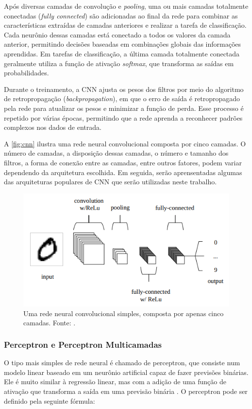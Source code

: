 Após diversas camadas de convolução e \textit{pooling}, uma ou mais camadas totalmente conectadas (\textit{fully connected}) são adicionadas ao final da rede para combinar as características extraídas de camadas anteriores e realizar a tarefa de classificação. Cada neurônio dessas camadas está conectado a todos os valores da camada anterior, permitindo decisões baseadas em combinações globais das informações aprendidas. Em tarefas de classificação, a última camada totalmente conectada geralmente utiliza a função de ativação \textit{softmax}, que transforma as saídas em probabilidades.

Durante o treinamento, a CNN ajusta os pesos dos filtros por meio do algoritmo de retropropagação (\textit{backpropagation}), em que o erro de saída é retropropagado pela rede para atualizar os pesos e minimizar a função de perda. Esse processo é repetido por várias épocas, permitindo que a rede aprenda a reconhecer padrões complexos nos dados de entrada.

A \autoref{fig:cnn} ilustra uma rede neural convolucional composta por cinco camadas. O número de camadas, a disposição dessas camadas, o número e tamanho dos filtros, a forma de conexão entre as camadas, entre outros fatores, podem variar dependendo da arquitetura escolhida. Em seguida, serão aprensentadas algumas das arquiteturas populares de CNN que serão utilizadas neste trabalho.

\begin{figure}
    \centering
    \includegraphics[width=0.5\linewidth]{figs/convolution-neural-network.png}
    \caption{Uma rede neural convolucional simples, composta por apenas cinco camadas. Fonte: \cite{Saxena2022}.}
    \label{fig:cnn}
\end{figure}

\subsubsection{Perceptron e Perceptron Multicamadas}


O tipo mais simples de rede neural é chamado de perceptron, que consiste num modelo linear baseado em um neurônio artificial capaz de fazer previsões binárias. Ele é muito similar à regressão linear, mas com a adição de uma função de ativação que transforma a saída em uma previsão binária \citep{James2000}. O perceptron pode ser definido pela seguinte fórmula:


